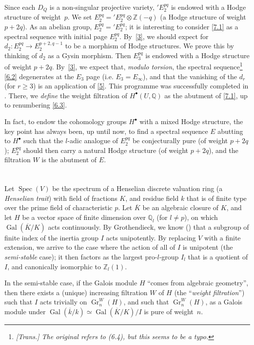 \documentclass{article}
\theoremstyle{plain}
\theoremstyle{definition}
\newenvironment{principle}[1]
    {\renewcommand\theinnercustomprinciple{#1}\innercustomprinciple}
    {\endinnercustomprinciple}
\newcommand{\ZZ}{\mathbb{Z}}
\newcommand{\QQ}{\mathbb{Q}}
\DeclareMathOperator{\Gr}{Gr}
\DeclareMathOperator{\Gal}{Gal}
\DeclareMathOperator{\Spec}{Spec}
\renewcommand{\geq}{\geqslant}
\newcommand{\oldpage}[1]{\marginpar{\footnotesize$\Big\vert$ \textit{p.~#1}}}
\begin{document}
\oldpage{428}
Since each $D_Q$ is a non-singular projective variety, $'E_2^{pq}$ is endowed with a Hodge structure of weight~$p$.
We set $E_2^{pq}='E_2^{pq}\otimes\ZZ(-q)$ (a Hodge structure of weight $p+2q$).
As an abelian group, $E_2^{pq}='E_2^{pq}$;
it is interesting to consider \cref{7.1} as a spectral sequence with initial page $E_2^{pq}$.
By~\cref{3}, we should expect for $d_2\colon E_2^{pq}\to E_2^{p+2,q-1}$ to be a morphism of Hodge structures.
We prove this by thinking of $d_2$ as a Gysin morphism.
Then $E_3^{pq}$ is endowed with a Hodge structure of weight $p+2q$.
By~\cref{3}, we expect that, \emph{modulo torsion}, the spectral sequence\footnote{\emph{[Trans.] The original refers to (6.4), but this seems to be a typo.}} \cref{6.2} degenerates at the $E_3$ page (i.e. $E_3=E_\infty$), and that the vanishing of the $d_r$ (for $r\geq3$) is an application of \cref{5}.
This programme was successfully completed in \cite[§3.2]{1}.
There, we \emph{define} the weight filtration of $H^\bullet(U,\QQ)$ as the abutment of \cref{7.1}, up to renumbering \cref{6.3}.

In fact, to endow the cohomology groups $H^\bullet$ with a mixed Hodge structure, the key point has always been, up until now, to find a spectral sequence $E$ abutting to $H^\bullet$ such that the $l$-adic analogue of $E_2^{pq}$ be conjecturally pure (of weight $p+2q$);
$E_2^{pq}$ should then carry a natural Hodge structure (of weight $p+2q$), and the filtration $W$ is the abutment of $E$.


\section{}
\label{8}

Let $\Spec(V)$ be the spectrum of a Henselian discrete valuation ring (a \emph{Henselian trait}) with field of fractions $K$, and residue field $k$ that is of finite type over the prime field of characteristic $p$.
Let $\overline{K}$ be an algebraic closure of $K$, and let $H$ be a vector space of finite dimension over $\QQ_l$ (for $l\neq p$), on which $\Gal(\overline{K}/K)$ acts continuously.
By Grothendieck, we know (\cite[Appendix]{4}) that a subgroup of finite index of the inertia group $I$ acts unipotently.
By replacing $V$ with a finite extension, we arrive to the case where the action of all of $I$ is unipotent (the \emph{semi-stable} case);
it then factors as the largest pro-$l$-group $I_l$ that is a quotient of $I$, and canonically isomorphic to $\ZZ_l(1)$.

\begin{principle}{8.1}
  In the semi-stable case, if the Galois module $H$ ``comes from algebraic geometry'', then there exists a (unique) increasing filtration $W$ of $H$ (the ``\emph{weight filtration}'') such that $I$ acts trivially on $\Gr_n^W(H)$, and such that $\Gr_n^W(H)$, as a Galois module under $\Gal(\overline{k}/k)\simeq\Gal(\overline{K}/K)/I$ is pure of weight~$n$.
\end{principle}
\end{document}
